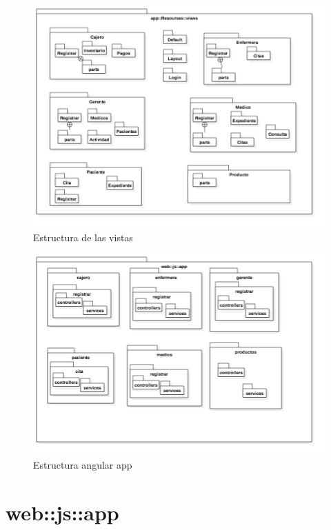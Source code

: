 	\begin{figure}[htbp!]
		\centering
			\includegraphics[width=1\textwidth]{images/logico33}
		\caption{Estructura de las vistas}
	\end{figure}
	
	\begin{figure}[htbp!]
		\centering
			\includegraphics[width=1\textwidth]{images/logico34}
		\caption{Estructura angular app}
	\end{figure}
	\newpage
	\section{web::js::app}
